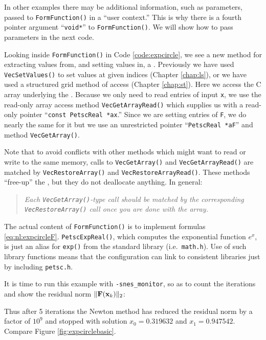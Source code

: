 In other examples there may be additional information, such as parameters, passed to \texttt{FormFunction()} in a ``user context.''  This is why there is a fourth pointer argument ``\texttt{void*}'' to \texttt{FormFunction()}.  We will show how to pass parameters in the next code.

Looking inside \texttt{FormFunction()} in Code \ref{code:expcircle}, we see a new method for extracting values from, and setting values in, a \pVec.  Previously we have used \texttt{VecSetValues()} to set values at given indices (Chapter \ref{chap:ls}), or we have used a \pDMDA structured grid method of access (Chapter \ref{chap:st}).  Here we access the C array underlying the \pVec.  Because we only need to read entries of input \pVec \texttt{x}, we use the read-only array access method \texttt{VecGetArrayRead()} which supplies us with a read-only pointer ``\texttt{const PetscReal *ax}.''  Since we are setting entries of \pVec \texttt{F}, we do nearly the same for it but we use an unrestricted pointer ``\texttt{PetscReal *aF}'' and method \texttt{VecGetArray()}.

Note that to avoid conflicts with other methods which might want to read or write to the same memory, calls to \texttt{VecGetArray()} and \texttt{VecGetArrayRead()} are matched by \texttt{VecRestoreArray()} and \texttt{VecRestoreArrayRead()}.  These methods ``free-up''  the \pVecs, but they do not deallocate anything.  In general:
\begin{quote}
\emph{Each \emph{\texttt{VecGetArray()}}-type call should be matched by the corresponding \emph{\texttt{VecRestoreArray()}} call once you are done with the array.}
\end{quote}

The actual content of \texttt{FormFunction()} is to implement formulas \eqref{eq:nl:expcircleF}.  \texttt{PetscExpReal()}, which computes the exponential function $e^x$, is just an alias for \texttt{exp()} from the standard library (i.e.~\texttt{math.h}).  Use of such \PETSc library functions means that the \PETSc configuration can link to consistent libraries just by including \texttt{petsc.h}.

It is time to run this example with \texttt{-snes\_monitor}, so as to count the iterations and show the residual norm $\|\mathbf{F}(\mathbf{x}_k)\|_2$:
Thus after 5 iterations the Newton method has reduced the residual norm by a factor of $10^9$ and stopped with solution $x_0=0.319632$ and $x_1=0.947542$.  Compare Figure \ref{fig:expcirclebasic}.

